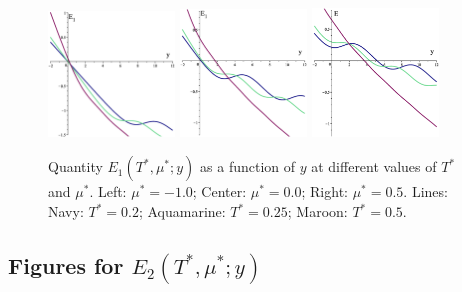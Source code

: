 \documentclass[12pt]{article}
\numberwithin{equation}{section}
\begin{document}
	\begin{figure}[htbp]
		\includegraphics[width=0.3\textwidth,angle=0]{images/E1y_vs_y_b1}
		\hfill
		\includegraphics[width=0.3\textwidth,angle=0]{images/E1y_vs_y_b2}
		\hfill
		\includegraphics[width=0.3\textwidth,angle=0]{images/E1y_vs_y_b3}
		\vfill
		\parbox{0.95\textwidth}{\caption{\label{fig:E1y_vs_y_b} Quantity $E_1(T^*,\mu^*;y)$ as a function of $y$ at different values of $T^*$ and $\mu^*$. Left: $\mu^*=-1.0$; Center: $\mu^*=0.0$; Right: $\mu^*=0.5$. Lines: Navy: $T^*=0.2$; Aquamarine: $T^*=0.25$; Maroon: $T^*=0.5$.}}
		
	\end{figure}
	
	\pagebreak
	
	\subsection{Figures for $E_2(T^*,\mu^*;y)$}
	\label{sec:figE2}
	
\end{document}
